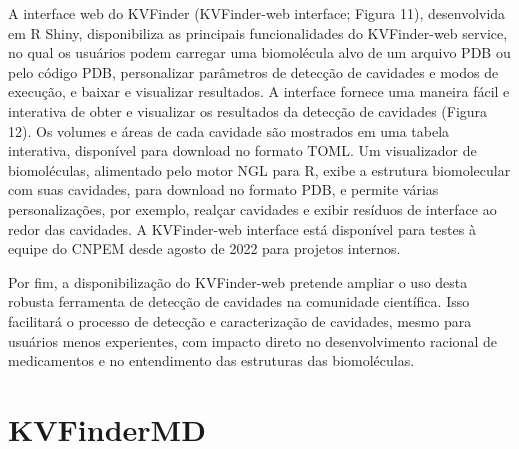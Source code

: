 \documentclass[Portugues]{phdquali}
\begin{document}
A interface web do KVFinder (KVFinder-web interface; Figura 11), desenvolvida em R Shiny, disponibiliza as principais funcionalidades do KVFinder-web service, no qual os usuários podem carregar uma biomolécula alvo de um arquivo PDB ou pelo código PDB, personalizar parâmetros de detecção de cavidades e modos de execução, e baixar e visualizar resultados. A interface fornece uma maneira fácil e interativa de obter e visualizar os resultados da detecção de cavidades (Figura 12). Os volumes e áreas de cada cavidade são mostrados em uma tabela interativa, disponível para download no formato TOML. Um visualizador de biomoléculas, alimentado pelo motor NGL para R, exibe a estrutura biomolecular com suas cavidades, para download no formato PDB, e permite várias personalizações, por exemplo, realçar cavidades e exibir resíduos de interface ao redor das cavidades. A KVFinder-web interface está disponível para testes à equipe do CNPEM desde agosto de 2022 para projetos internos. 

Por fim, a disponibilização do KVFinder-web pretende ampliar o uso desta robusta ferramenta de detecção de cavidades na comunidade científica. Isso facilitará o processo de detecção e caracterização de cavidades, mesmo para usuários menos experientes, com impacto direto no desenvolvimento racional de medicamentos e no entendimento das estruturas das biomoléculas. 

\section{KVFinderMD}

\end{document}
